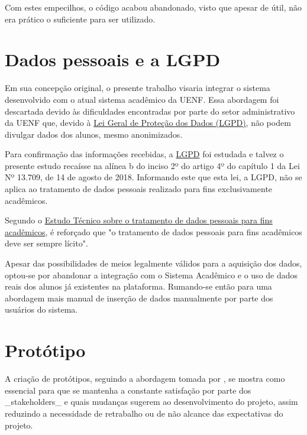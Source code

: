         Com estes empecilhos, o código acabou abandonado, visto que apesar de útil, não era prático o suficiente para ser utilizado.

\section{Dados pessoais e a LGPD} %

    Em sua concepção original, o presente trabalho visaria integrar o sistema desenvolvido com o atual sistema acadêmico da UENF. Essa abordagem foi descartada devido às dificuldades encontradas por parte do setor administrativo da UENF que, devido à \href{https://www.planalto.gov.br/ccivil_03/_ato2015-2018/2018/lei/l13709.htm}{Lei Geral de Proteção dos Dados (LGPD)}, não podem divulgar dados dos alunos, mesmo anonimizados.

    Para confirmação das informações recebidas, a \href{https://www.planalto.gov.br/ccivil_03/_ato2015-2018/2018/lei/l13709.htm}{LGPD} foi estudada e talvez o presente estudo recaísse na alínea b do inciso 2º do artigo 4º do capítulo 1 da Lei Nº 13.709, de 14 de agosto de 2018. Informando este que esta lei, a LGPD, não se aplica ao tratamento de dados pessoais realizado para fins exclusivamente acadêmicos.

    Segundo o \href{https://www.gov.br/anpd/pt-br/assuntos/noticias/sei_00261-000810_2022_17.pdf}{Estudo Técnico sobre o tratamento de dados pessoais para fins acadêmicos}, é reforçado que "o tratamento de dados pessoais para fins acadêmicos deve ser sempre lícito".

    Apesar das possibilidades de meios legalmente válidos para a aquisição dos dados, optou-se por abandonar a integração com o Sistema Acadêmico e o uso de dados reais dos alunos já existentes na plataforma. Rumando-se então para uma abordagem mais manual de inserção de dados manualmente por parte dos usuários do sistema.

\section{Protótipo} %

    A criação de protótipos, seguindo a abordagem tomada por \cite{andre_interaction_2018}, se mostra como essencial para que se mantenha a constante satisfação por parte dos _stakeholders_ e quais mudanças sugerem ao desenvolvimento do projeto, assim reduzindo a necessidade de retrabalho ou de não alcance das expectativas do projeto.

